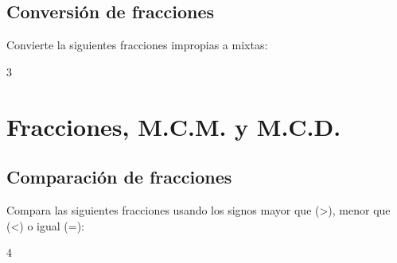 \documentclass[12pt,addpoints,answers]{evalua}
\begin{document}
\begin{questions}
	\subsection{Conversión de fracciones}

	\question[4] Convierte la siguientes fracciones impropias a mixtas:

	\begin{multicols}{3}
	\end{multicols}

	\section{Fracciones, M.C.M. y M.C.D.}

	\subsection{Comparación de fracciones}

	\question[8] Compara las siguientes fracciones usando los signos mayor que (>), menor que (<) o igual (=):

	\begin{multicols}{4}
\end{multicols}
\end{questions}
\end{document}
